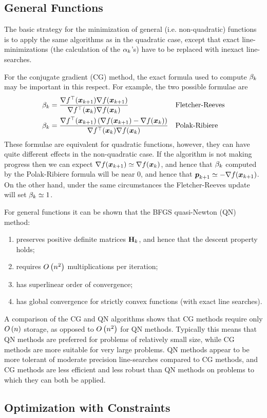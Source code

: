\subsection{General Functions}

The basic strategy for the minimization of general (i.e. non-quadratic) functions is to apply the same algorithms as in the quadratic case, except that exact line-minimizations (the calculation of the $\alpha_k$'s) have to be replaced with inexact line-searches.

For the conjugate gradient (CG) method, the exact formula used to compute $\beta_k$ may be important in this respect. For example, the two possible formulae are
\begin{align*}
	\beta_k&=\frac{\nabla f^\top(\boldsymbol{x}_{k+1})\nabla f(\boldsymbol{x}_{k+1})}{\nabla f^\top(\boldsymbol{x}_k)\nabla f(\boldsymbol{x}_k)} && \text{Fletcher-Reeves} \\
	\beta_k&=\frac{\nabla f^\top(\boldsymbol{x}_{k+1})\left(\nabla f(\boldsymbol{x}_{k+1})-\nabla f(\boldsymbol{x}_k)\right)}{\nabla f^\top(\boldsymbol{x}_k)\nabla f(\boldsymbol{x}_k)} && \text{Polak-Ribiere}
\end{align*}
These formulae are equivalent for quadratic functions, however, they can have quite different effects in the non-quadratic case. If the algorithm is not making progress then we can expect $\nabla f(\boldsymbol{x}_{k+1})\simeq\nabla f(\boldsymbol{x}_k)$, and hence that $\beta_k$ computed by the Polak-Ribiere formula will be near 0, and hence that $\boldsymbol{p}_{k+1}\simeq-\nabla f(\boldsymbol{x}_{k+1})$. On the other hand, under the same circumstances the Fletcher-Reeves update will set $\beta_k\simeq1$.

For general functions it can be shown that the BFGS quasi-Newton (QN) method:
\begin{enumerate}
	\item preserves positive definite matrices $\mathbf{H}_k$, and hence that the descent property holds;
	\item requires $O\left(n^2\right)$ multiplications per iteration;
	\item has superlinear order of convergence;
	\item has global convergence for strictly convex functions (with exact line searches).
\end{enumerate}

A comparison of the CG and QN algorithms shows that CG methods require only $O\left(n\right)$ storage, as opposed to $O\left(n^2\right)$ for QN methods. Typically this means that QN methods are preferred for problems of relatively small size, while CG methods are more suitable for very large problems. QN methods appear to be more tolerant of moderate precision line-searches compared to CG methods, and CG methods are less efficient and less robust than QN methods on problems to which they can both be applied.

\subsection{Optimization with Constraints}